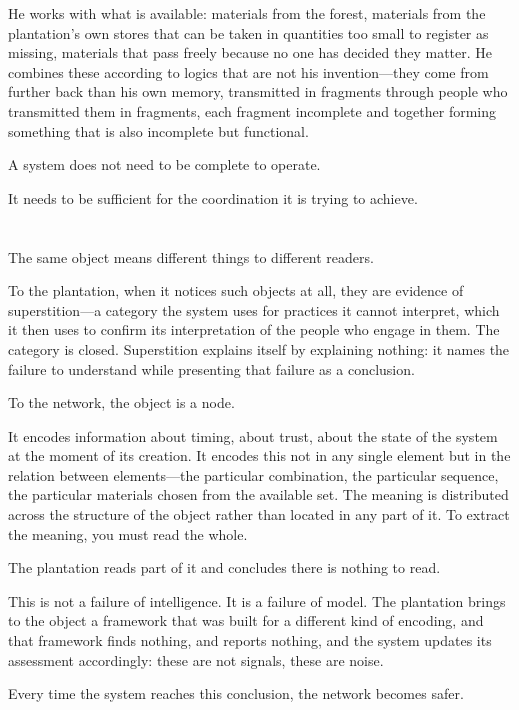 He works with what is available: materials from the forest,
materials from the plantation's own stores that can be taken
in quantities too small to register as missing, materials that
pass freely because no one has decided they matter. He combines
these according to logics that are not his invention---they
come from further back than his own memory, transmitted in
fragments through people who transmitted them in fragments,
each fragment incomplete and together forming something that
is also incomplete but functional.

A system does not need to be complete to operate.

It needs to be sufficient for the coordination it is trying
to achieve.

\section{}

The same object means different things to different readers.

To the plantation, when it notices such objects at all, they
are evidence of superstition---a category the system uses for
practices it cannot interpret, which it then uses to confirm
its interpretation of the people who engage in them. The
category is closed. Superstition explains itself by explaining
nothing: it names the failure to understand while presenting
that failure as a conclusion.

To the network, the object is a node.

It encodes information about timing, about trust, about the
state of the system at the moment of its creation. It
encodes this not in any single element but in the relation
between elements---the particular combination, the particular
sequence, the particular materials chosen from the available
set. The meaning is distributed across the structure of the
object rather than located in any part of it. To extract
the meaning, you must read the whole.

The plantation reads part of it and concludes there is nothing
to read.

This is not a failure of intelligence. It is a failure of
model. The plantation brings to the object a framework that
was built for a different kind of encoding, and that framework
finds nothing, and reports nothing, and the system updates
its assessment accordingly: these are not signals, these are
noise.

Every time the system reaches this conclusion, the network
becomes safer.

